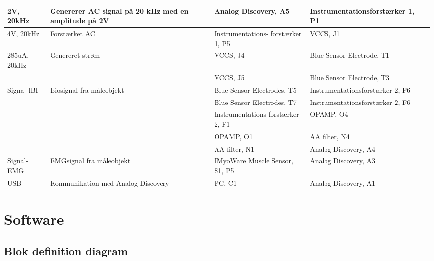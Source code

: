 \begin{table}[H]
\begin{tabular}{|p{1.1cm}|p{2cm}|p{1.4cm}|p{3.5cm}|p{4.4cm}|p{2cm}|}
 
 2V, 20kHz & Genererer AC signal på 20 kHz med en amplitude på 2V &  & Analog Discovery, A5& Instrumentationsforstærker 1, P1 &     \\ \cline{4-6} \hline

4V, 20kHz & Forstærket AC &  & Instrumentations- forstærker 1, P5& VCCS, J1 &     \\ \cline{4-6} \hline

285uA, 20kHz & Genereret strøm &  & VCCS, J4 &Blue Sensor Electrode, T1 &     \\ \cline{4-6} 

&  &   &  VCCS, J5 & Blue Sensor Electrode, T3 & \\ \cline{4-6} \hline

Signa- lBI & Biosignal fra måleobjekt  & & Blue Sensor Electrodes, T5& Instrumentationsforstærker 2, F6 &     \\ \cline{4-6}

&  &   &  Blue Sensor Electrodes, T7 &Instrumentationsforstærker 2, F6 & \\ \cline{4-6} 
&  &   &  Instrumentations forstærker 2, F1 & OPAMP, O4& \\ \cline{4-6} 
&  &   &  OPAMP, O1 & AA filter, N4 & \\ \cline{4-6} 
&  &   &  AA filter, N1 & Analog Discovery, A4 & \\ \cline{4-6}  \hline


Signal- EMG& EMGsignal fra måleobjekt &  & IMyoWare Muscle Sensor, S1, P5& Analog Discovery, A3 &     \\ \cline{4-6} \hline

USB& Kommunikation med Analog Discovery &  & PC, C1& Analog Discovery, A1 &     \\ \cline{4-6} \hline

\end{tabular}
\end{table}

\chapter{Software} \label{swafsnit}
\section{Blok definition diagram}

